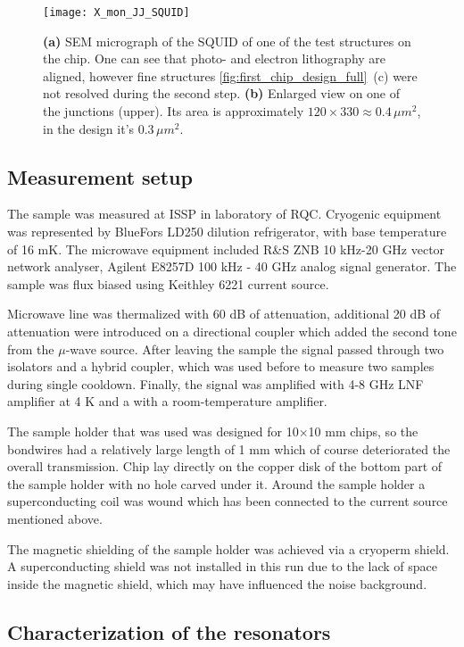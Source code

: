 \documentclass[12pt, twoside]{report}
\numberwithin{equation}{section}
\begin{document}
\begin{figure}
\centering
\texttt{[image: X\_mon\_JJ\_SQUID]}
\caption{\textbf{(a)} SEM micrograph of the SQUID of one of the test structures on the chip. One can see that photo- and electron lithography are aligned, however fine structures \autoref{fig:first_chip_design_full}~(c) were not resolved during the second step. \textbf{(b)} Enlarged view on one of the junctions (upper). Its area is approximately $120\times 330\approx 0.4\, \mu m^2$, in the design it's $0.3\,\mu m^2$.} 
\end{figure}

\subsection{Measurement setup}

The sample was measured at ISSP in laboratory of RQC. Cryogenic equipment was represented by BlueFors LD250 dilution refrigerator, with base temperature of 16 mK. The microwave equipment included R\&S ZNB 10 kHz-20 GHz vector network analyser,  Agilent E8257D 100 kHz - 40 GHz analog signal generator. The sample was flux biased using Keithley 6221 current source.

Microwave line was thermalized with 60 dB of attenuation, additional 20 dB of attenuation were introduced on a directional coupler which added the second tone from the $\mu$-wave source. After leaving the sample the signal passed through two isolators and a hybrid coupler, which was used before to measure two samples during single cooldown. Finally, the signal was amplified with 4-8 GHz LNF amplifier at 4 K and a with a room-temperature amplifier.

The sample holder that was used was designed for 10$\times$10 mm chips, so the bondwires had a relatively large length of 1 mm which of course deteriorated the overall transmission. Chip lay directly on the copper disk of the bottom part of the sample holder with no hole carved under it. Around the sample holder a superconducting coil was wound which has been connected to the current source mentioned above.

The magnetic shielding of the sample holder was achieved via a cryoperm shield. A superconducting shield was not installed in this run due to the lack of space inside the magnetic shield, which may have influenced the noise background.


\subsection{Characterization of the resonators}
\end{document}
